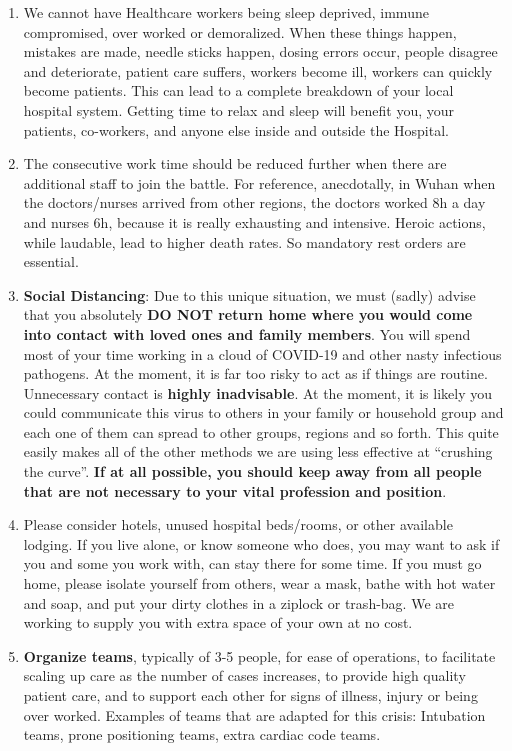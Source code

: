 \documentclass[onecolumn,journal]{IEEEtran}
\begin{document}
\begin{multicols}{2}
\begin{enumerate}
\item We cannot have Healthcare workers being sleep deprived, immune compromised, over worked or demoralized.  When these things happen, mistakes are made, needle sticks happen, dosing errors occur, people disagree and deteriorate, patient care suffers, workers become ill, workers can quickly become patients. This can lead to a complete breakdown of your local hospital system. Getting time to relax and sleep will benefit you, your patients, co-workers, and anyone else inside and outside the Hospital.

\item The consecutive work time should be reduced further when there are additional staff to join the battle. For reference, anecdotally, in Wuhan when the doctors/nurses arrived from other regions, the doctors worked 8h a day and nurses 6h, because it is really exhausting and intensive. Heroic actions, while laudable, lead to higher death rates. So mandatory rest orders are essential. 

\item \textbf{Social Distancing}: Due to this unique situation, we must (sadly) advise that you absolutely \textbf{DO NOT return home where you would come into contact with loved ones and family members}. You will spend most of your time working in a cloud of COVID-19 and other nasty infectious pathogens.  At the moment, it is far too risky to act as if things are routine.  Unnecessary contact is \textbf{highly inadvisable}. At the moment, it is likely you could communicate this virus to others in your family or household group and each one of them can spread to other groups, regions and so forth. This quite easily makes all of the other methods we are using less effective at ``crushing the curve''. \textbf{If at all possible, you should keep away from all people that are not necessary to your vital profession and position}.  

\item Please consider hotels, unused hospital beds/rooms, or other available lodging. If you live alone, or know someone who does, you may want to ask if you and some you work with, can stay there for some time.  If you must go home, please isolate yourself from others, wear a mask, bathe with hot water and soap, and put your dirty clothes in a ziplock or trash-bag.  We are working to supply you with extra space of your own at no cost.

\item \textbf{Organize teams}, typically of 3-5 people, for ease of operations, to facilitate scaling up care as the number of cases increases, to provide high quality patient care, and  to support each other for signs of illness, injury or being over worked. Examples of teams that are adapted for this crisis: Intubation teams, prone positioning teams, extra cardiac code teams. 


\end{enumerate}
\end{multicols}
\end{document}
